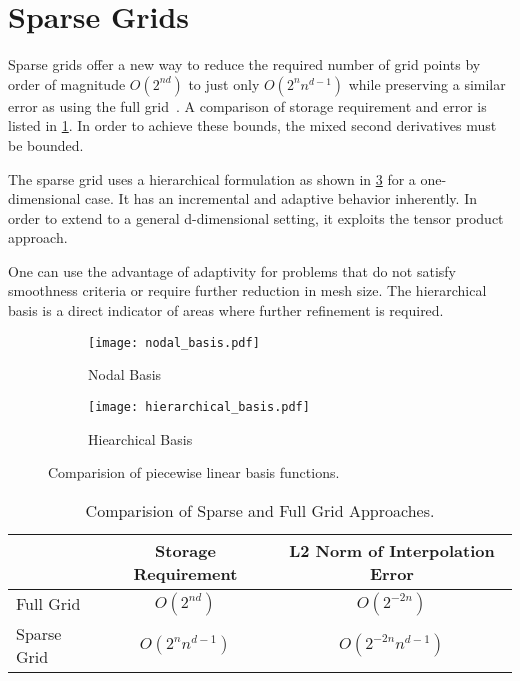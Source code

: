 
\section{Sparse Grids}\label{sec:sparsegrid}

Sparse grids offer a new way to reduce the required number of grid points by order of magnitude \(O(2^{nd})\) to just only \(O(2^n n^{d-1})\) while preserving a similar error as using the full grid~\cite{Garcke2012}.
A comparison of storage requirement and error is listed in \cref{tab:comparisionfull}.
In order to achieve these bounds, the mixed second derivatives must be bounded.

The sparse grid uses a hierarchical formulation as shown in \cref{fig:basiscomp} for a one-dimensional case.
It has an incremental and adaptive behavior inherently. In order to extend to a general d-dimensional setting, it exploits
the tensor product approach.

One can use the advantage of adaptivity for problems that do not satisfy smoothness criteria or require further reduction in mesh size.
The hierarchical basis is a direct indicator of areas where further refinement is required.

\begin{figure}
    \centering
    \begin{subfigure}{0.45\textwidth}
        \texttt{[image: nodal\_basis.pdf]}
        \caption{Nodal Basis}
        \label{fig:nodalbasis}
    \end{subfigure}
    \begin{subfigure}{0.45\textwidth}
        \texttt{[image: hierarchical\_basis.pdf]}
        \caption{Hiearchical Basis}
        \label{fig:hierarchicalbasis}
    \end{subfigure}
    \caption{Comparision of piecewise linear basis functions.}
    \label{fig:basiscomp}
\end{figure}

\begin{table}[hbpt]
    \centering
    \caption{Comparision of Sparse and Full Grid Approaches.}
    \begin{tabular}{l c c}
        \multicolumn{1}{c}{} & Storage Requirement  & \multicolumn{1}{c}{L2 Norm of Interpolation Error} \\
        \toprule
        Full Grid            & \(O(2^{nd})\)        & \(O(2^{-2n})\)                                     \\
        \midrule
        Sparse Grid          & \(O(2^{n} n^{d-1})\) & \(O(2^{-2n} n^{d-1})\)                             \\
        \bottomrule
    \end{tabular}
    \label{tab:comparisionfull}
\end{table}

